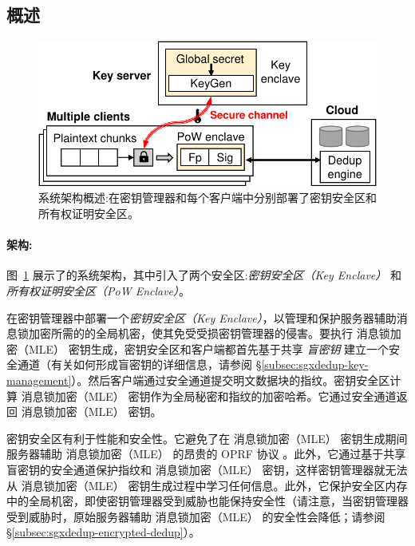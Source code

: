 \subsection{概述}
\label{subsec:sgxdedup-arch}

\begin{figure}[t]
\centering
\includegraphics[width=\textwidth]{pic/sgxdedup/overview.pdf}
\caption{\sysnameS 系统架构概述:\sysnameS 在密钥管理器和每个客户端中分别部署了密钥安全区和所有权证明安全区。}
\label{fig:sgxdedup-overview}
\vspace{-3pt}
\end{figure}

\paragraph*{架构:} 图~\ref{fig:sgxdedup-overview} 展示了\sysnameS 的系统架构，其中引入了两个安全区:\textit{密钥安全区（Key Enclave）} 和 \textit{所有权证明安全区（PoW Enclave）}。 

\sysnameS 在密钥管理器中部署一个\textit{密钥安全区（Key Enclave）}，以管理和保护服务器辅助消息锁加密所需的的全局机密，使其免受受损密钥管理器的侵害。要执行 消息锁加密（MLE） 密钥生成，密钥安全区和客户端都首先基于共享 \textit{盲密钥} 建立一个安全通道（有关如何形成盲密钥的详细信息，请参阅 \S\ref{subsec:sgxdedup-key-management}）。然后客户端通过安全通道提交明文数据块的指纹。密钥安全区计算 消息锁加密（MLE） 密钥作为全局秘密和指纹的加密哈希。它通过安全通道返回 消息锁加密（MLE） 密钥。

密钥安全区有利于性能和安全性。它避免了在 消息锁加密（MLE） 密钥生成期间服务器辅助 消息锁加密（MLE） 的昂贵的 OPRF 协议 \cite{bellare2013DupLESS}。此外，它通过基于共享盲密钥的安全通道保护指纹和 消息锁加密（MLE） 密钥，这样密钥管理器就无法从 消息锁加密（MLE） 密钥生成过程中学习任何信息。此外，它保护安全区内存中的全局机密，即使密钥管理器受到威胁也能保持安全性（请注意，当密钥管理器受到威胁时，原始服务器辅助 消息锁加密（MLE） 的安全性会降低；请参阅 \S\ref{subsec:sgxdedup-encrypted-dedup}）。

